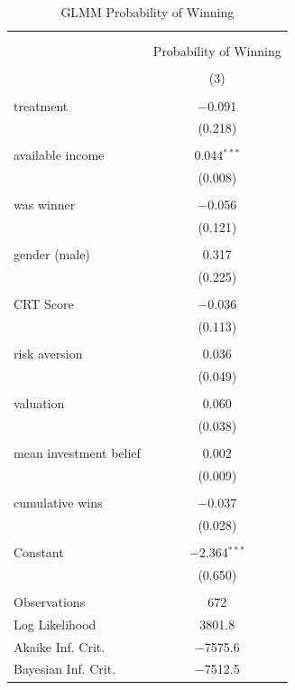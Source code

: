 \begin{appendices}
\begin{table}[!htbp] \centering 
  \caption{GLMM Probability of Winning} 
  \label{ax:glm_prob} 
\begin{tabular}{@{\extracolsep{5pt}}lc} 
\\[-1.8ex]\hline 
\hline \\[-1.8ex] 
\\[-1.8ex] & \multicolumn{1}{c}{Probability of Winning} \\ 
\\[-1.8ex] & (3)\\ 
\hline \\[-1.8ex] 
 treatment & $-$0.091 \\ 
  & (0.218) \\ 
  &  \\ 
 available income & 0.044$^{***}$  \\ 
  & (0.008) \\ 
  & \\ 
 was winner & $-$0.056 \\ 
  & (0.121) \\ 
  & \\ 
 gender (male) & 0.317\\ 
   & (0.225) \\ 
   & \\ 
 CRT Score  & $-$0.036 \\ 
  & (0.113) \\ 
  & \\ 
 risk aversion & 0.036 \\ 
  & (0.049) \\ 
  & \\ 
 valuation & 0.060 \\ 
  & (0.038) \\ 
  & \\ 
 mean investment belief & 0.002 \\ 
  & (0.009) \\ 
  & \\
 cumulative wins & $-$0.037 \\ 
  & (0.028) \\ 
  & \\ 
 Constant & $-$2.364$^{***}$ \\ 
  & (0.650) \\ 
  & \\ 
  \hline
Observations & 672 \\ 
Log Likelihood & 3801.8 \\ 
Akaike Inf. Crit. & $-$7575.6 \\ 
Bayesian Inf. Crit. & $-$7512.5 \\

\end{tabular}
\end{table}
\end{appendices}
